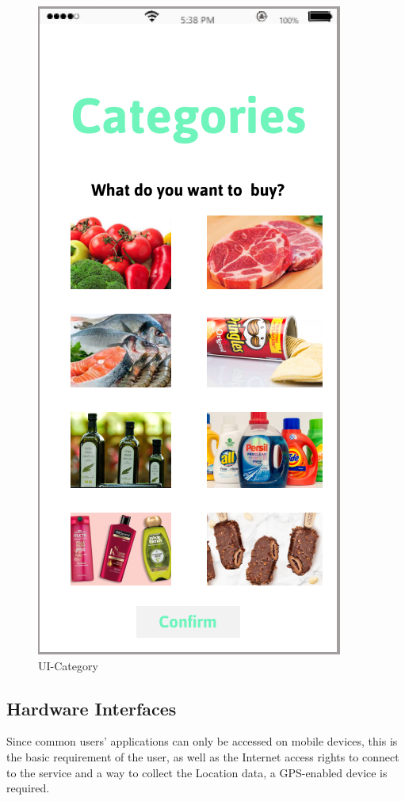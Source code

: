 \documentclass[a4paper,12pt]{report}
\begin{document}
\begin{figure}[H] 
	\centering  
	\includegraphics[scale=0.5]{UI-Category.png}
	\caption{UI-Category}
	\centering
	\label{UI-Category}
\end{figure}


\subsection{Hardware Interfaces}
Since common users’ applications can only be accessed on mobile devices, this is the basic requirement of the user, as well as the Internet access rights to connect to the service and
a way to collect the Location data, a GPS-enabled device is required.
\end{document}
